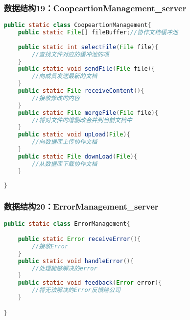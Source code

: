 \subsubsection{数据结构19：CoopeartionManagement\_server}
\begin{lstlisting}[language=Java, caption=在线协作类]
public static class CoopeartionManagement{
    public static File[] fileBuffer;//协作文档缓冲池
    
    public static int selectFile(File file){
        //查找文件对应的缓冲池的项
    }
    public static void sendFile(File file){
        //向成员发送最新的文档
    }
    public static File receiveContent(){
        //接收修改的内容
    }
    public static File mergeFile(File file){
        //将对文件的增删改合并到当前文档中
    }
    public static void upLoad(File){
        //向数据库上传协作文档
    }
    public static File downLoad(File){
        //从数据库下载协作文档
    }
    
} 
\end{lstlisting}
\subsubsection{数据结构20：ErrorManagement\_server}
\begin{lstlisting}[language=Java, caption=在线协作类]
public static class ErrorManagement{

    public static Error receiveError(){
        //接收Error
    }
    public static void handleError(){
        //处理能够解决的error
    }
    public static void feedback(Error error){
        //将无法解决的Error反馈给公司
    }

} 
\end{lstlisting}

